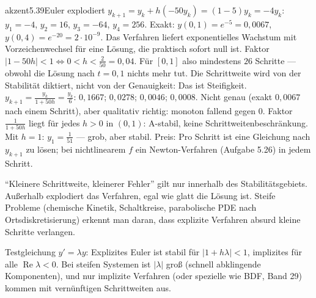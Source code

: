 \begin{loesungkarte}{akzent}{5.39}{Euler explodiert}
$y_{k+1} = y_k + h(-50y_k) = (1 - 5)y_k = -4y_k$: $y_1 = -4$, $y_2 = 16$, $y_3 = -64$, $y_4 = 256$. Exakt: $y(0{,}1) = e^{-5} = 0{,}0067$, $y(0{,}4) = e^{-20} = 2\cdot10^{-9}$. Das Verfahren liefert exponentielles Wachstum mit Vorzeichenwechsel für eine Lösung, die praktisch sofort null ist.
Faktor $|1 - 50h| < 1\iff0 < h < \frac2{50} = 0{,}04$. Für $[0, 1]$ also mindestens $26$ Schritte --- obwohl die Lösung nach $t = 0{,}1$ nichts mehr tut. Die Schrittweite wird von der Stabilität diktiert, nicht von der Genauigkeit: Das ist Steifigkeit.
$y_{k+1} = \frac{y_k}{1 + 50h} = \frac{y_k}6$: $0{,}1667$; $0{,}0278$; $0{,}0046$; $0{,}0008$. Nicht genau (exakt $0{,}0067$ nach einem Schritt), aber qualitativ richtig: monoton fallend gegen $0$.
Faktor $\frac1{1 + 50h}$ liegt für jedes $h > 0$ in $(0, 1)$: A-stabil, keine Schrittweitenbeschränkung. Mit $h = 1$: $y_1 = \frac1{51}$ --- grob, aber stabil. Preis: Pro Schritt ist eine Gleichung nach $y_{k+1}$ zu lösen; bei nichtlinearem $f$ ein Newton-Verfahren (Aufgabe 5.26) in jedem Schritt.
\begin{center}
\end{center}
\begin{fehler}\kastentext
\enquote{Kleinere Schrittweite, kleinerer Fehler} gilt nur innerhalb des Stabilitätsgebiets. Außerhalb explodiert das Verfahren, egal wie glatt die Lösung ist. Steife Probleme (chemische Kinetik, Schaltkreise, parabolische PDE nach Ortsdiskretisierung) erkennt man daran, dass explizite Verfahren absurd kleine Schritte verlangen.
\end{fehler}
\begin{mitnehmen}\kastentext
Testgleichung $y' = \lambda y$: Explizites Euler ist stabil für $|1 + h\lambda| < 1$, implizites für alle $\operatorname{Re}\lambda < 0$. Bei steifen Systemen ist $|\lambda|$ groß (schnell abklingende Komponenten), und nur implizite Verfahren (oder spezielle wie BDF, Band 29) kommen mit vernünftigen Schrittweiten aus.
\end{mitnehmen}
\end{loesungkarte}

